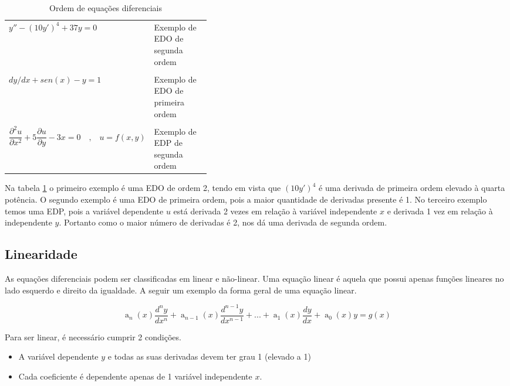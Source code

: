 \begin{center}
\begin{table}[h!]
\centering
\begin{tabular}{l  p{0.4\linewidth}}

\toprule
$  y'' - (10y')^4 + 37y = 0  $ & Exemplo de EDO de segunda ordem \\
\\
$ dy/dx + sen(x) - y = 1 $ & Exemplo de EDO de primeira ordem \\ 
\\
 $
\dfrac{\partial^2u}{\partial x^2} + 5 \dfrac{\partial u}{\partial y} - 3x = 0 \quad \textrm{,} \quad   u = f(x,y)
$
 &  
 Exemplo de EDP de segunda ordem 
 \\
 
\bottomrule


\end{tabular}
\caption{Ordem de equações diferenciais}
\label{tabelaOrdem}
\end{table}
\end{center}

Na tabela \ref{tabelaOrdem} o primeiro exemplo é uma EDO de ordem 2, tendo em vista que $(10y')^4$ é uma derivada de primeira ordem elevado à quarta potência.
O segundo exemplo é uma EDO de primeira ordem, pois a maior quantidade de derivadas presente é 1.
No terceiro exemplo temos uma EDP, pois a variável dependente $u$ está derivada 2 vezes em relação à variável independente $x$ e derivada 1 vez em relação à independente $y$. Portanto como o maior número de derivadas é 2, nos dá uma derivada de segunda ordem.

\subsection[Linearidade]{Linearidade}
As equações diferenciais podem ser classificadas em linear e não-linear.
Uma equação linear é aquela que possui apenas funções lineares no lado esquerdo e direito da igualdade. A seguir um exemplo da forma geral de uma equação linear.
\begin{center}
\begin{equation} \label{formaGeral}
 \operatorname{a}_{n}(x) \dfrac{d^ny}{dx^n} + \operatorname{a}_{n-1}(x)\dfrac{d^{n-1}y}{dx^{n-1}} + ... + \operatorname{a}_{1}(x)\dfrac{dy}{dx} + \operatorname{a}_{0}(x)y = g(x) 
\end{equation}
\end{center}

Para ser linear, é necessário cumprir 2 condições. 
\begin{itemize}
	\item{}A variável dependente $y$ e todas as suas derivadas devem ter grau 1 (elevado a 1)
	\item{}Cada coeficiente é dependente apenas de 1 variável independente $x$.
\end{itemize}

